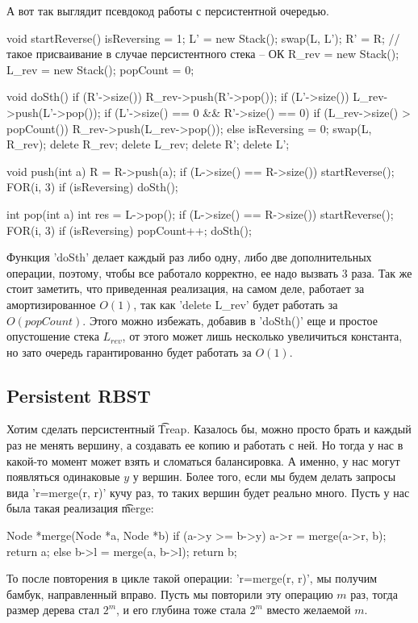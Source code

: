А вот так выглядит псевдокод работы с персистентной очередью.

\begin{cppcode}
void startReverse(){
	isReversing = 1;
	L' = new Stack();
	swap(L, L');
	R' = R; //такое присваивание в случае персистентного стека -- ОК
	R_rev = new Stack();
	L_rev = new Stack();	
	popCount = 0;
}

void doSth(){
	if (R'->size())
		R_rev->push(R'->pop());
	if (L'->size())
		L_rev->push(L'->pop());
	if (L'->size() == 0 && R'->size() == 0) 
		if (L_rev->size() > popCount())
			R_rev->push(L_rev->pop());
		else{
			isReversing = 0;
			swap(L, R_rev);
			delete R_rev;
			delete L_rev;
			delete R';
			delete L';
		}			
}

void push(int a){
	R = R->push(a);
	if (L->size() == R->size())
		startReverse();
	FOR(i, 3)
		if (isReversing)
			doSth();
}

int pop(int a){
	int res = L->pop();
	if (L->size() == R->size())
		startReverse();
	FOR(i, 3)
		if (isReversing)
		{
		    popCount++;
			doSth();
		}
}
\end{cppcode}

\begin{Rem}
	Функция \cpp'doSth' делает каждый раз либо одну, либо две дополнительных операции, поэтому, чтобы
	все работало корректно, ее надо вызвать 3 раза. 
	Так же стоит заметить, что приведенная реализация, на самом деле, работает за амортизированное $O(1)$, так как
	\cpp'delete L_rev' будет работать за $O(popCount)$. 
	Этого можно избежать, добавив в \cpp'doSth()' еще и простое опустошение стека $L_{rev}$, от этого может лишь несколько
	увеличиться константа, но зато очередь гарантированно будет работать за $O(1)$.

\end{Rem}

\subsection{Persistent RBST}

Хотим сделать персистентный \t{Treap}. Казалось бы, можно просто брать и каждый раз не менять вершину, а 
создавать ее копию и работать с ней. Но тогда у нас в какой-то момент может взять и сломаться балансировка.
А именно, у нас могут появляться одинаковые $y$ у вершин. 
Более того, если мы будем делать запросы вида \cpp'r=merge(r, r)' кучу раз, то таких вершин будет реально много.
Пусть у нас была такая реализация \t{merge}:
\begin{cppcode}
Node *merge(Node *a, Node *b){
	if (a->y >= b->y) {
		a->r = merge(a->r, b);
		return a;
	} else {
		b->l = merge(a, b->l);
		return b;
	}
}	
\end{cppcode}
То после повторения в цикле такой операции: \cpp'r=merge(r, r)', мы получим бамбук, направленный вправо.
Пусть мы повторили эту операцию $m$ раз, тогда размер дерева стал $2^m$, и его глубина тоже стала $2^m$ 
вместо желаемой $m$.

